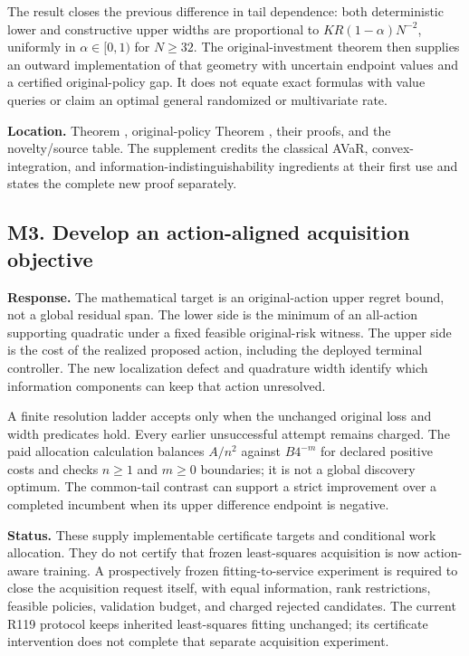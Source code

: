 The result closes the previous difference in tail dependence: both deterministic lower and constructive upper widths are proportional to \(KR(1-\alpha)N^{-2}\), uniformly in \(\alpha\in[0,1)\) for \(N\ge32\). The original-investment theorem then supplies an outward implementation of that geometry with uncertain endpoint values and a certified original-policy gap. It does not equate exact formulas with value queries or claim an optimal general randomized or multivariate rate.

\textbf{Location.} Theorem , original-policy Theorem , their proofs, and the novelty/source table. The supplement credits the classical AVaR, convex-integration, and information-indistinguishability ingredients at their first use and states the complete new proof separately.

\hypertarget{m3.-develop-an-action-aligned-acquisition-objective}{%
\subsection{M3. Develop an action-aligned acquisition objective}\label{m3.-develop-an-action-aligned-acquisition-objective}}

\textbf{Response.} The mathematical target is an original-action upper regret bound, not a global residual span. The lower side is the minimum of an all-action supporting quadratic under a fixed feasible original-risk witness. The upper side is the cost of the realized proposed action, including the deployed terminal controller. The new localization defect and quadrature width identify which information components can keep that action unresolved.

A finite resolution ladder accepts only when the unchanged original loss and width predicates hold. Every earlier unsuccessful attempt remains charged. The paid allocation calculation balances \(A/n^2\) against \(B4^{-m}\) for declared positive costs and checks \(n\ge1\) and \(m\ge0\) boundaries; it is not a global discovery optimum. The common-tail contrast can support a strict improvement over a completed incumbent when its upper difference endpoint is negative.

\textbf{Status.} These supply implementable certificate targets and conditional work allocation. They do not certify that frozen least-squares acquisition is now action-aware training. A prospectively frozen fitting-to-service experiment is required to close the acquisition request itself, with equal information, rank restrictions, feasible policies, validation budget, and charged rejected candidates. The current R119 protocol keeps inherited least-squares fitting unchanged; its certificate intervention does not complete that separate acquisition experiment.

